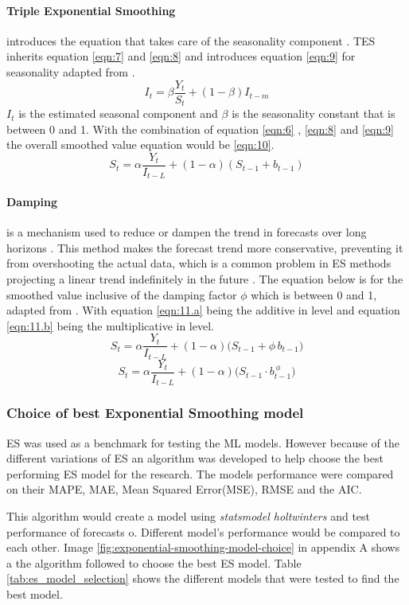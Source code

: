  \paragraph{Triple Exponential Smoothing }introduces the equation that takes care of the seasonality component \cite{nist_double_exp_smoothing}. TES inherits equation \ref{eqn:7} and \ref{eqn:8} and introduces equation \ref{eqn:9} for seasonality adapted from \cite{nist_double_exp_smoothing}.
 \[
 I_t = \beta \frac{Y_t}{S_t} + (1-\beta) I_{t-m}  
 \tag{14}
 \label{eqn:9}
 \]
 $I_t$ is the estimated seasonal component and $\beta$ is the seasonality constant that is between 0 and 1. With the combination of equation \ref{eqn:6} , \ref{eqn:8}  and \ref{eqn:9} the overall smoothed value equation would be \ref{eqn:10}. 
 \[
 S_t = \alpha \frac{Y_t}{I_{t-L}} + (1-\alpha)(S_{t-1}+b_{t-1})
 \tag{15}
 \label{eqn:10}
 \]
 
 \paragraph{Damping} is a mechanism used to reduce or dampen the trend in forecasts over long horizons \cite{taylor2003exponential}. This method makes the forecast trend more conservative, preventing it from overshooting the actual data, which is a common problem in ES methods projecting a linear trend indefinitely in the future \cite{taylor2003exponential}. The equation below is for the smoothed value inclusive of the damping factor $\phi$ which is between 0 and 1, adapted from \cite{taylor2003exponential}. With equation \ref{eqn:11.a} being the additive in level and equation \ref{eqn:11.b} being the multiplicative in level.
 \[
 	S_t = \alpha \frac{Y_t}{I_{t-L}} + (1-\alpha)\bigl(S_{t-1} + \phi\, b_{t-1}) 
 \tag{16}
 \label{eqn:11.a}
 \] 
 \[
 S_t = \alpha \frac{Y_t}{I_{t-L}} + (1-\alpha)\bigl(S_{t-1} \cdot b_{t-1}^{\,\phi}\bigr)
 \tag{17}
 \label{eqn:11.b}
 \]
 

 \subsubsection{Choice of best Exponential Smoothing model}
 ES was used as a benchmark for testing the ML models. However because of the different variations of ES an algorithm was  developed to help choose the best performing ES model for the research. The models performance were compared on their MAPE, MAE, Mean Squared Error(MSE), RMSE and the AIC.
 
 This algorithm would create a model using \textit{statsmodel holtwinters} \cite{statsmodels_expsmoothing_doc} and test  performance of forecasts o. Different model's performance would be compared to each other. Image \ref{fig:exponential-smoothing-model-choice} in appendix A shows a the algorithm followed to choose the best ES model. Table \ref{tab:es_model_selection} shows the different models that were tested to find the best model.


